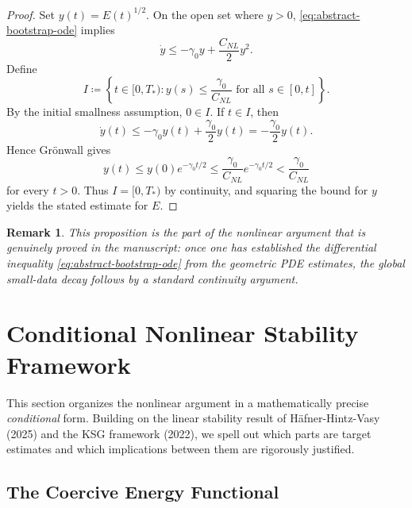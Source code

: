 \documentclass[12pt,a4paper]{article}
\newtheorem{remark}[theorem]{Remark}
\begin{document}
\begin{proof}
Set $y(t)=E(t)^{1/2}$. On the open set where $y>0$, \eqref{eq:abstract-bootstrap-ode} implies
\begin{equation}
\dot y \le -\gamma_0 y + \frac{C_{NL}}{2}y^2.
\end{equation}
Define
\begin{equation}
I\coloneqq \left\{t\in[0,T_*): y(s)\le \frac{\gamma_0}{C_{NL}}\text{ for all }s\in[0,t]\right\}.
\end{equation}
By the initial smallness assumption, $0\in I$. If $t\in I$, then
\begin{equation}
\dot y(t)\le -\gamma_0 y(t)+\frac{\gamma_0}{2}y(t)= -\frac{\gamma_0}{2}y(t).
\end{equation}
Hence Gr\"onwall gives
\begin{equation}
y(t)\le y(0)e^{-\gamma_0 t/2}\le \frac{\gamma_0}{C_{NL}}e^{-\gamma_0 t/2}<\frac{\gamma_0}{C_{NL}}
\end{equation}
for every $t>0$. Thus $I=[0,T_*)$ by continuity, and squaring the bound for $y$ yields the stated estimate for $E$.
\end{proof}

\begin{remark}
This proposition is the part of the nonlinear argument that is genuinely proved in the manuscript: once one has established the differential inequality \eqref{eq:abstract-bootstrap-ode} from the geometric PDE estimates, the global small-data decay follows by a standard continuity argument.
\end{remark}

\section{Conditional Nonlinear Stability Framework}\label{sec:nonlinear-framework}

This section organizes the nonlinear argument in a mathematically precise \emph{conditional} form. Building on the linear stability result of Häfner-Hintz-Vasy (2025) and the KSG framework (2022), we spell out which parts are target estimates and which implications between them are rigorously justified.

\subsection{The Coercive Energy Functional}
\end{document}
